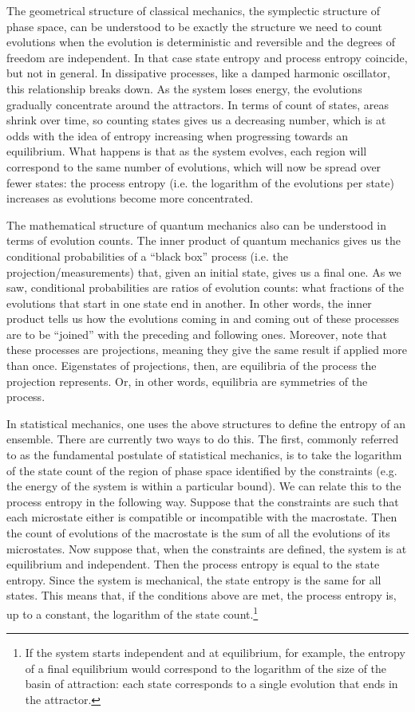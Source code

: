 \documentclass[letterpaper,twocolumn]{article}
\begin{document}
The geometrical structure of classical mechanics, the symplectic structure of phase space, can be understood to be exactly the structure we need to count evolutions when the evolution is deterministic and reversible and the degrees of freedom are independent. In that case state entropy and process entropy coincide, but not in general. In dissipative processes, like a damped harmonic oscillator, this relationship breaks down. As the system loses energy, the evolutions gradually concentrate around the attractors. In terms of count of states, areas shrink over time, so counting states gives us a decreasing number, which is at odds with the idea of entropy increasing when progressing towards an equilibrium. What happens is that as the system evolves, each region will correspond to the same number of evolutions, which will now be spread over fewer states: the process entropy (i.e. the logarithm of the evolutions per state) increases as evolutions become more concentrated.

The mathematical structure of quantum mechanics also can be understood in terms of evolution counts. The inner product of quantum mechanics gives us the conditional probabilities of a ``black box'' process (i.e. the projection/measurements) that, given an initial state, gives us a final one. As we saw, conditional probabilities are ratios of evolution counts: what fractions of the evolutions that start in one state end in another. In other words, the inner product tells us how the evolutions coming in and coming out of these processes are to be ``joined'' with the preceding and following ones.  Moreover, note that these processes are projections, meaning they give the same result if applied more than once. Eigenstates of projections, then, are equilibria of the process the projection represents. Or, in other words, equilibria are symmetries of the process.

In statistical mechanics, one uses the above structures to define the entropy of an ensemble. There are currently two ways to do this. The first, commonly referred to as the fundamental postulate of statistical mechanics, is to take the logarithm of the state count of the region of phase space identified by the constraints (e.g. the energy of the system is within a particular bound). We can relate this to the process entropy in the following way. Suppose that the constraints are such that each microstate either is compatible or incompatible with the macrostate. Then the count of evolutions of the macrostate is the sum of all the evolutions of its microstates. Now suppose that, when the constraints are defined, the system is at equilibrium and independent. Then the process entropy is equal to the state entropy. Since the system is mechanical, the state entropy is the same for all states. This means that, if the conditions above are met, the process entropy is, up to a constant, the logarithm of the state count.\footnote{If the system starts independent and at equilibrium, for example, the entropy of a final equilibrium would correspond to the logarithm of the size of the basin of attraction: each state corresponds to a single evolution that ends in the attractor.}
\end{document}
